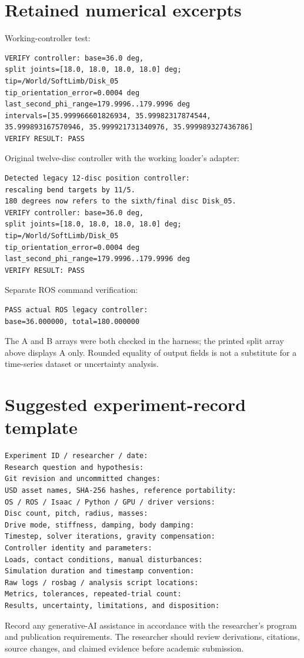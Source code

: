 \documentclass[11pt,letterpaper]{article}
\begin{document}
\section{Retained numerical excerpts}\label{app:results}
Working-controller test:
\begin{lstlisting}
VERIFY controller: base=36.0 deg,
split joints=[18.0, 18.0, 18.0, 18.0] deg;
tip=/World/SoftLimb/Disk_05
tip_orientation_error=0.0004 deg
last_second_phi_range=179.9996..179.9996 deg
intervals=[35.999966601826934, 35.99982317874544,
35.999893167570946, 35.999921731340976, 35.999989327436786]
VERIFY RESULT: PASS
\end{lstlisting}
Original twelve-disc controller with the working loader's adapter:
\begin{lstlisting}
Detected legacy 12-disc position controller:
rescaling bend targets by 11/5.
180 degrees now refers to the sixth/final disc Disk_05.
VERIFY controller: base=36.0 deg,
split joints=[18.0, 18.0, 18.0, 18.0] deg;
tip=/World/SoftLimb/Disk_05
tip_orientation_error=0.0004 deg
last_second_phi_range=179.9996..179.9996 deg
VERIFY RESULT: PASS
\end{lstlisting}
Separate ROS command verification:
\begin{lstlisting}
PASS actual ROS legacy controller:
base=36.000000, total=180.000000
\end{lstlisting}
The A and B arrays were both checked in the harness; the printed split array
above displays A only. Rounded equality of output fields is not a substitute
for a time-series dataset or uncertainty analysis.

\section{Suggested experiment-record template}
\begin{lstlisting}
Experiment ID / researcher / date:
Research question and hypothesis:
Git revision and uncommitted changes:
USD asset names, SHA-256 hashes, reference portability:
OS / ROS / Isaac / Python / GPU / driver versions:
Disc count, pitch, radius, masses:
Drive mode, stiffness, damping, body damping:
Timestep, solver iterations, gravity compensation:
Controller identity and parameters:
Loads, contact conditions, manual disturbances:
Simulation duration and timestamp convention:
Raw logs / rosbag / analysis script locations:
Metrics, tolerances, repeated-trial count:
Results, uncertainty, limitations, and disposition:
\end{lstlisting}
Record any generative-AI assistance in accordance with the researcher's
program and publication requirements. The researcher should review derivations,
citations, source changes, and claimed evidence before academic submission.
\end{document}

